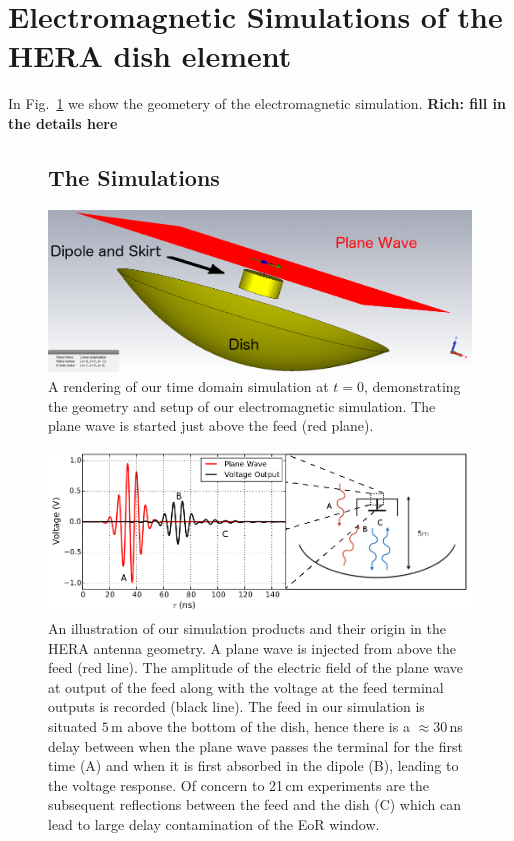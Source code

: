 \documentclass[preprint]{emulateapj}
\begin{document}
\section{Electromagnetic Simulations of the HERA dish element}\label{sec:Simulations}
In Fig.~\ref{fig:SimulationSetup} we show the geometery of the electromagnetic simulation. {\bf Rich: fill in the details here}
\begin{figure}


\subsection{The Simulations}
\includegraphics[width=.5\textwidth]{figures/One_dish_Pfeed_render_pw_0deg.png}
\caption{A rendering of our time domain simulation at $t=0$, demonstrating the geometry and setup of our electromagnetic simulation. The plane wave is started just above the feed (red plane).}\label{fig:SimulationSetup}
\end{figure}

\begin{figure}
\includegraphics[width=\textwidth]{figures/SimulationIllustration.png}
\caption{An illustration of our simulation products and their origin in the HERA antenna geometry. A plane wave is injected from above the feed (red line). The amplitude of the electric field of the plane wave at output of the feed along with the voltage at the feed terminal outputs is recorded (black line). The feed in our simulation is situated $5$\,m above the bottom of the dish, hence there is a $\approx 30$\,ns delay between when the plane wave passes the terminal for the first time (A) and when it is first absorbed in the dipole (B), leading to the voltage response. Of concern to 21\,cm experiments are the subsequent reflections between the feed and the dish (C) which can lead to large delay contamination of the EoR window.}
\label{fig:Simulation}
\end{figure}
\end{document}
